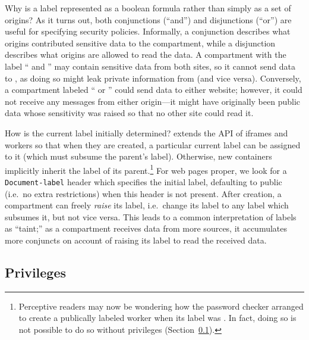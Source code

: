 %
Why is a label represented as a boolean formula rather than simply
as a set of origins?
%
As it turns out, both conjunctions (``and'')
and disjunctions (``or'') are useful for specifying security policies.
%
Informally, a conjunction describes what origins contributed sensitive data
to the compartment, while a disjunction describes what origins are allowed
to read the data.
%
A compartment with the label `` and ''
may contain sensitive data from both sites, so it cannot send data to
, as doing so might leak private information from
 (and vice versa).
%
Conversely, a compartment labeled `` or ''
could send data to either website; however, it could not receive any
messages from either origin---it might have originally been public data
whose sensitivity was raised so that no other site could read it.

How is the current label initially determined?
%
\sys{} extends the API of iframes and workers so that when they are
created, a particular current label can be assigned to it (which
must subsume the parent's label).  Otherwise, new containers implicitly
inherit the label of its parent.\footnote{Perceptive readers may now be wondering how
the password checker arranged to create a publically labeled worker
when its label was .  In fact, doing so is not possible
to do so without privileges (Section~\ref{sec:privileges}).}
%
For web pages proper, we look for a {\tt Document-label} header which
specifies the initial label, defaulting to public (i.e.\ no extra
restrictions) when this header is not present.
%
After creation, a compartment can freely \emph{raise} its label, i.e.\
change its label to any label which subsumes it, but not vice versa.
%
This leads to a common interpretation of labels as ``taint;'' as
a compartment receives data from more sources, it accumulates more
conjuncts on account of raising its label to read the received data.

\subsection{Privileges}
\label{sec:privileges}

